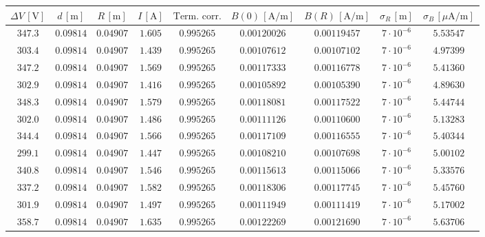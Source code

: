 \documentclass[]{article}
\begin{document}
\begin{table}
    \centering

\begin{tabular}{||c|c|c|c|c|c|c|c|c||}
    \hline
    $\Delta V\, [\text{V}] $ & $d\, [\text{m}] $ & $R\, [\text{m}] $ & $I\, [\text{A}] $ & $\text{Term. corr.}$ & $B(0)\, [\text{A/m}] $ & $B(R)\, [\text{A/m}] $ & $ \sigma_R \, [\text{m}] $ & $ \sigma_B \, [\mu\text{A/m}] $ \\
    \hline\hline



    $347.3$ & $0.09814$ & $0.04907$ & $1.605$ & $0.995265$ & $0.00120026$ & $0.00119457$ & $7 \cdot 10^{-6}$ & $5.53547$ \\\hline
    $303.4$ & $0.09814$ & $0.04907$ & $1.439$ & $0.995265$ & $0.00107612$ & $0.00107102$ & $7 \cdot 10^{-6}$ & $4.97399$ \\\hline
    $347.2$ & $0.09814$ & $0.04907$ & $1.569$ & $0.995265$ & $0.00117333$ & $0.00116778$ & $7 \cdot 10^{-6}$ & $5.41360$ \\\hline
    $302.9$ & $0.09814$ & $0.04907$ & $1.416$ & $0.995265$ & $0.00105892$ & $0.00105390$ & $7 \cdot 10^{-6}$ & $4.89630$ \\\hline
    $348.3$ & $0.09814$ & $0.04907$ & $1.579$ & $0.995265$ & $0.00118081$ & $0.00117522$ & $7 \cdot 10^{-6}$ & $5.44744$ \\\hline
    $302.0$ & $0.09814$ & $0.04907$ & $1.486$ & $0.995265$ & $0.00111126$ & $0.00110600$ & $7 \cdot 10^{-6}$ & $5.13283$ \\\hline
    $344.4$ & $0.09814$ & $0.04907$ & $1.566$ & $0.995265$ & $0.00117109$ & $0.00116555$ & $7 \cdot 10^{-6}$ & $5.40344$ \\\hline
    $299.1$ & $0.09814$ & $0.04907$ & $1.447$ & $0.995265$ & $0.00108210$ & $0.00107698$ & $7 \cdot 10^{-6}$ & $5.00102$ \\\hline
    $340.8$ & $0.09814$ & $0.04907$ & $1.546$ & $0.995265$ & $0.00115613$ & $0.00115066$ & $7 \cdot 10^{-6}$ & $5.33576$ \\\hline
    $337.2$ & $0.09814$ & $0.04907$ & $1.582$ & $0.995265$ & $0.00118306$ & $0.00117745$ & $7 \cdot 10^{-6}$ & $5.45760$ \\\hline
    $301.9$ & $0.09814$ & $0.04907$ & $1.497$ & $0.995265$ & $0.00111949$ & $0.00111419$ & $7 \cdot 10^{-6}$ & $5.17002$ \\\hline
    $358.7$ & $0.09814$ & $0.04907$ & $1.635$ & $0.995265$ & $0.00122269$ & $0.00121690$ & $7 \cdot 10^{-6}$ & $5.63706$ \\\hline

\end{tabular}
\end{table}
\end{document}
